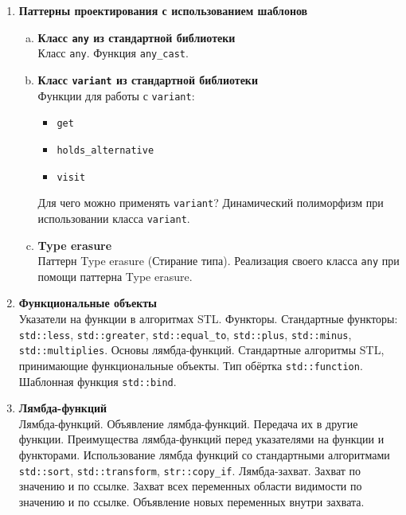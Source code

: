 \documentclass{article}
\begin{document}
\ifx

\begin{enumerate}

\item \textbf{Паттерны проектирования с использованием шаблонов}
\begin{enumerate}[a.]
\item \textbf{Класс \texttt{any} из стандартной библиотеки}\\
Класс \texttt{any}. Функция \texttt{any\_cast}. 


\item \textbf{Класс \texttt{variant} из стандартной библиотеки}\\
Функции для работы с \texttt{variant}:
\begin{itemize}
\item \texttt{get}
\item \texttt{holds\_alternative}
\item \texttt{visit}
\end{itemize}
Для чего можно применять \texttt{variant}? Динамический полиморфизм при использовании класса \texttt{variant}.

\item \textbf{Type erasure}\\
Паттерн Type erasure (Стирание типа). Реализация своего класса \texttt{any} при помощи паттерна Type erasure.
\end{enumerate}

\item \textbf{Функциональные объекты}\\
Указатели на функции в алгоритмах STL. Функторы. Стандартные функторы: \texttt{std::less}, \texttt{std::greater}, \texttt{std::equal\_to}, \texttt{std::plus}, \texttt{std::minus}, \texttt{std::multiplies}. Основы лямбда-функций. Стандартные алгоритмы STL, принимающие функциональные объекты. Тип обёртка \texttt{std::function}. Шаблонная функция \texttt{std::bind}.

\item \textbf{Лямбда-функций}\\
Лямбда-функций. Объявление лямбда-функций. Передача их в другие функции. Преимущества лямбда-функций перед указателями на функции и функторами. Использование лямбда функций со стандартными алгоритмами \texttt{std::sort}, \texttt{std::transform}, \texttt{str::copy\_if}. Лямбда-захват. Захват по значению и по ссылке. Захват всех переменных области видимости по значению и по ссылке. Объявление новых переменных внутри захвата.








\end{enumerate}
\end{document}
